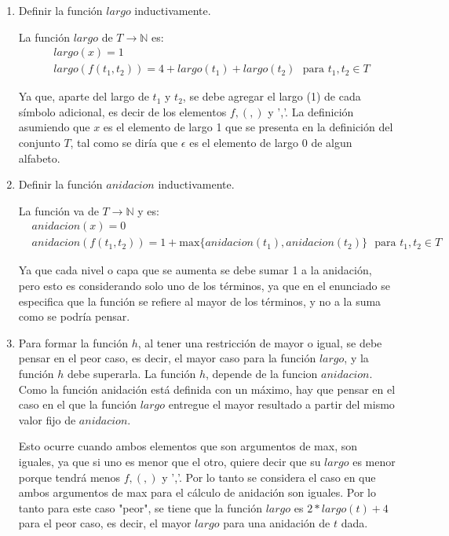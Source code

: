 \documentclass[letter]{article}
\begin{document}
	\begin{pregunta}{1} %
		\begin{enumerate}
		\item Definir la función $largo$ inductivamente.
		
		La función $largo$ de $T\rightarrow \mathbb{N}$ es:
		\begin{align*}
			&largo(x) = 1\\
			&largo(f(t_1,t_2)) = 4 + largo(t_1) + largo(t_2)\ \ \ \text{para } t_1, t_2 \in T
		\end{align*}
		
		Ya que, aparte del largo de $t_1$ y $t_2$, se debe agregar el largo (1) de cada símbolo adicional, es decir de los elementos $f, (, )$ y ','. La definición asumiendo que $x$ es el elemento de largo 1 que se presenta en la definición del conjunto $T$, tal como se diría que $\epsilon$ es el elemento de largo 0 de algun alfabeto.
		
		\item Definir la función $anidacion$ inductivamente.
		
		La función va de $T\rightarrow \mathbb{N}$ y es:
		\begin{align*}
			&anidacion(x) = 0\\
			&anidacion(f(t_1, t_2)) = 1 + \text{max}\{anidacion(t_1), anidacion(t_2)\}\ \ \ \text{para } t_1, t_2 \in T
		\end{align*}
	
		Ya que cada nivel o capa que se aumenta se debe sumar 1 a la anidación, pero esto es considerando solo uno de los términos, ya que en el enunciado se especifica que la función se refiere al mayor de los términos, y no a la suma como se podría pensar.
		
		\item 
		
		Para formar la función $h$, al tener una restricción de mayor o igual, se debe pensar en el peor caso, es decir, el mayor caso para la función $largo$, y la función $h$ debe superarla. La función $h$, depende de la funcion $anidacion$. Como la función anidación está definida con un máximo, hay que pensar en el caso en el que la función $largo$ entregue el mayor resultado a partir del mismo valor fijo de $anidacion$.
		
		Esto ocurre cuando ambos elementos que son argumentos de max, son iguales, ya que si uno es menor que el otro, quiere decir que su $largo$ es menor porque tendrá menos $f, (, )$ y ','. Por lo tanto se considera el caso en que ambos argumentos de max para el cálculo de anidación son iguales. Por lo tanto para este caso "peor", se tiene que la función $largo$ es $2*largo(t)+4$ para el peor caso, es decir, el mayor $largo$ para una anidación de $t$ dada.
		

\end{enumerate}
\end{pregunta}
\end{document}
